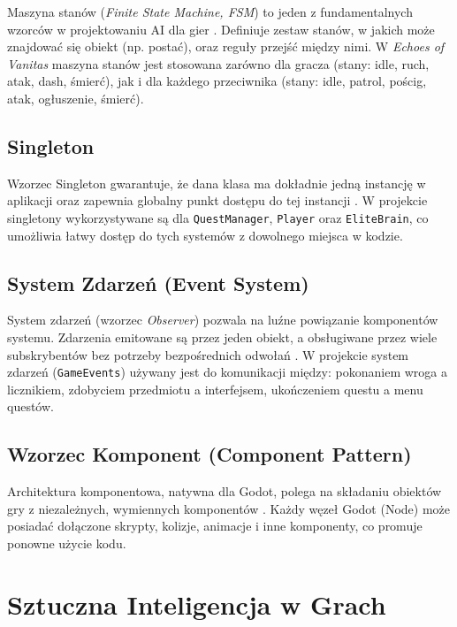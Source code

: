 Maszyna stanów (\textit{Finite State Machine, FSM}) to jeden z fundamentalnych wzorców w projektowaniu AI dla gier \cite{millington2009ai}. Definiuje zestaw stanów, w jakich może znajdować się obiekt (np. postać), oraz reguły przejść między nimi. W \textit{Echoes of Vanitas} maszyna stanów jest stosowana zarówno dla gracza (stany: idle, ruch, atak, dash, śmierć), jak i dla każdego przeciwnika (stany: idle, patrol, pościg, atak, ogłuszenie, śmierć).

\subsection{Singleton}

Wzorzec Singleton gwarantuje, że dana klasa ma dokładnie jedną instancję w aplikacji oraz zapewnia globalny punkt dostępu do tej instancji \cite{gamma1994design}. W projekcie singletony wykorzystywane są dla \texttt{QuestManager}, \texttt{Player} oraz \texttt{EliteBrain}, co umożliwia łatwy dostęp do tych systemów z dowolnego miejsca w kodzie.

\subsection{System Zdarzeń (Event System)}

System zdarzeń (wzorzec \textit{Observer}) pozwala na luźne powiązanie komponentów systemu. Zdarzenia emitowane są przez jeden obiekt, a obsługiwane przez wiele subskrybentów bez potrzeby bezpośrednich odwołań \cite{nystrom2014game}. W projekcie system zdarzeń (\texttt{GameEvents}) używany jest do komunikacji między: pokonaniem wroga a licznikiem, zdobyciem przedmiotu a interfejsem, ukończeniem questu a menu questów.

\subsection{Wzorzec Komponent (Component Pattern)}

Architektura komponentowa, natywna dla Godot, polega na składaniu obiektów gry z niezależnych, wymiennych komponentów \cite{nystrom2014game}. Każdy węzeł Godot (Node) może posiadać dołączone skrypty, kolizje, animacje i inne komponenty, co promuje ponowne użycie kodu.

\section{Sztuczna Inteligencja w Grach}


